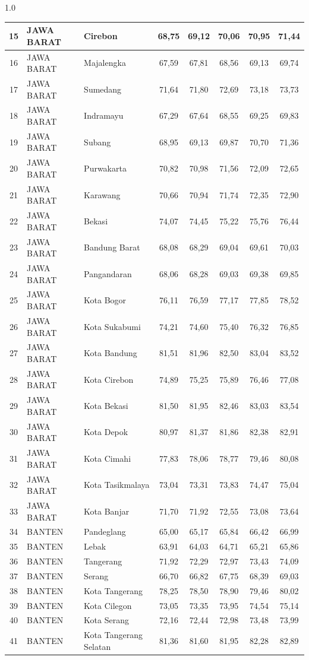 \begin{spacing}{1.0}
\begin{longtable}{|c|p{2.2cm}|p{2.8cm}|c|c|c|c|c|}
15 & JAWA BARAT & Cirebon & 68,75 & 69,12 & 70,06 & 70,95 & 71,44 \\ \hline
16 & JAWA BARAT & Majalengka & 67,59 & 67,81 & 68,56 & 69,13 & 69,74 \\ \hline
17 & JAWA BARAT & Sumedang & 71,64 & 71,80 & 72,69 & 73,18 & 73,73 \\ \hline
18 & JAWA BARAT & Indramayu & 67,29 & 67,64 & 68,55 & 69,25 & 69,83 \\ \hline
19 & JAWA BARAT & Subang & 68,95 & 69,13 & 69,87 & 70,70 & 71,36 \\ \hline
20 & JAWA BARAT & Purwakarta & 70,82 & 70,98 & 71,56 & 72,09 & 72,65 \\ \hline
21 & JAWA BARAT & Karawang & 70,66 & 70,94 & 71,74 & 72,35 & 72,90 \\ \hline
22 & JAWA BARAT & Bekasi & 74,07 & 74,45 & 75,22 & 75,76 & 76,44 \\ \hline
23 & JAWA BARAT & Bandung Barat & 68,08 & 68,29 & 69,04 & 69,61 & 70,03 \\ \hline
24 & JAWA BARAT & Pangandaran & 68,06 & 68,28 & 69,03 & 69,38 & 69,85 \\ \hline
25 & JAWA BARAT & Kota Bogor & 76,11 & 76,59 & 77,17 & 77,85 & 78,52 \\ \hline
26 & JAWA BARAT & Kota Sukabumi & 74,21 & 74,60 & 75,40 & 76,32 & 76,85 \\ \hline
27 & JAWA BARAT & Kota Bandung & 81,51 & 81,96 & 82,50 & 83,04 & 83,52 \\ \hline
28 & JAWA BARAT & Kota Cirebon & 74,89 & 75,25 & 75,89 & 76,46 & 77,08 \\ \hline
29 & JAWA BARAT & Kota Bekasi & 81,50 & 81,95 & 82,46 & 83,03 & 83,54 \\ \hline
30 & JAWA BARAT & Kota Depok & 80,97 & 81,37 & 81,86 & 82,38 & 82,91 \\ \hline
31 & JAWA BARAT & Kota Cimahi & 77,83 & 78,06 & 78,77 & 79,46 & 80,08 \\ \hline
32 & JAWA BARAT & Kota Tasikmalaya & 73,04 & 73,31 & 73,83 & 74,47 & 75,04 \\ \hline
33 & JAWA BARAT & Kota Banjar & 71,70 & 71,92 & 72,55 & 73,08 & 73,64 \\ \hline
34 & BANTEN & Pandeglang & 65,00 & 65,17 & 65,84 & 66,42 & 66,99 \\ \hline
35 & BANTEN & Lebak & 63,91 & 64,03 & 64,71 & 65,21 & 65,86 \\ \hline
36 & BANTEN & Tangerang & 71,92 & 72,29 & 72,97 & 73,43 & 74,09 \\ \hline
37 & BANTEN & Serang & 66,70 & 66,82 & 67,75 & 68,39 & 69,03 \\ \hline
38 & BANTEN & Kota Tangerang & 78,25 & 78,50 & 78,90 & 79,46 & 80,02 \\ \hline
39 & BANTEN & Kota Cilegon & 73,05 & 73,35 & 73,95 & 74,54 & 75,14 \\ \hline
40 & BANTEN & Kota Serang & 72,16 & 72,44 & 72,98 & 73,48 & 73,99 \\ \hline
41 & BANTEN & Kota Tangerang Selatan & 81,36 & 81,60 & 81,95 & 82,28 & 82,89 \\ \hline
\end{longtable}
\end{spacing}
\newpage
